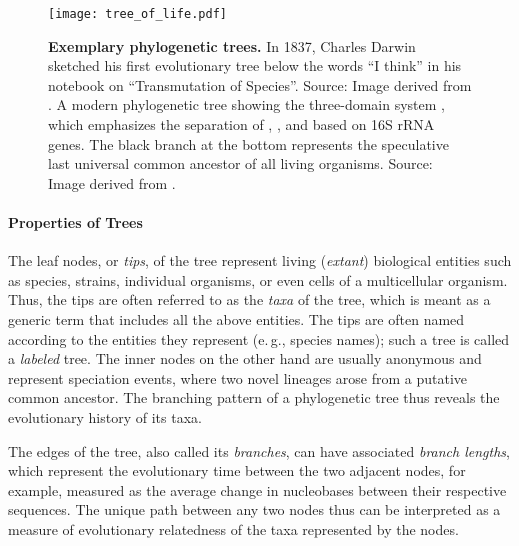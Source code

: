 \begin{figure}[hpbt]
    \centering
    \texttt{[image: tree\_of\_life.pdf]}
    \begin{subfigure}{0pt}
        \label{fig:tree_of_life:sub:darwin}
    \end{subfigure}
    \begin{subfigure}{0pt}
        \label{fig:tree_of_life:sub:woese}
    \end{subfigure}
    \caption[Exemplary phylogenetic trees]{
        \textbf{Exemplary phylogenetic trees.}
        In 1837, Charles Darwin sketched his first evolutionary tree below the words ``I think''
        in his notebook on ``Transmutation of Species''.
        Source: Image derived from \cite{DarwinTreeOfLife1837}.
        A modern phylogenetic tree showing the three-domain system \cite{Woese1977,Woese1990},
        which emphasizes the separation of , , and 
        based on 16S rRNA genes.
        The black branch at the bottom represents the speculative last universal common ancestor of all living organisms.
        Source: Image derived from \cite{WoeseTreeOfLife2006}.
    }
    \label{fig:tree_of_life}
\end{figure}

\paragraph{Properties of Trees}
\label{ch:Foundations:sec:TreeOfLife:sub:PhylogeneticTrees:par:TreeProperties}

The leaf nodes, or \emph{tips}, of the tree represent living (\emph{extant}) biological entities
such as species, strains, individual organisms, or even cells of a multicellular organism.
Thus, the tips are often referred to as the \emph{taxa} of the tree,
which is meant as a generic term that includes all the above entities.
The tips are often named according to the entities they represent (e.\,g., species names);
such a tree is called a \emph{labeled} tree.
The inner nodes on the other hand are usually anonymous and
represent speciation events, where two novel lineages arose from a putative common ancestor.
The branching pattern of a phylogenetic tree thus reveals the evolutionary history of its taxa.

The edges of the tree, also called its \emph{branches}, can have associated \emph{branch lengths},
which represent the evolutionary time between the two adjacent nodes,
for example, measured as the average change in nucleobases between their respective sequences.
The unique path between any two nodes thus can be interpreted
as a measure of evolutionary relatedness of the taxa represented by the nodes.

